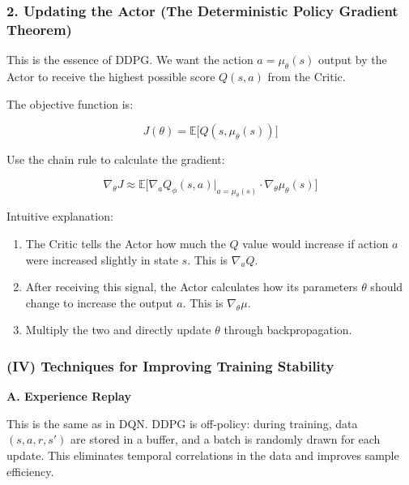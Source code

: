 \hypertarget{updating-the-actor-the-deterministic-policy-gradient-theorem}{%
\subsubsection{2. Updating the Actor (The Deterministic Policy Gradient Theorem)}\label{updating-the-actor-the-deterministic-policy-gradient-theorem}}

This is the essence of DDPG. We want the action \(a=\mu_\theta(s)\) output by the Actor to receive the highest possible score \(Q(s,a)\) from the Critic.

The objective function is:

\[
J(\theta)
=
\mathbb{E}\bigl[
Q(s,\mu_\theta(s))
\bigr]
\]

Use the chain rule to calculate the gradient:

\[
\nabla_\theta J
\approx
\mathbb{E}
\bigl[
\nabla_a Q_\phi(s,a)
\big|_{a=\mu_\theta(s)}
\cdot
\nabla_\theta \mu_\theta(s)
\bigr]
\]

Intuitive explanation:

\begin{enumerate}
\def\labelenumi{\arabic{enumi}.}
\tightlist
\item
  The Critic tells the Actor how much the \(Q\) value would increase if action \(a\) were increased slightly in state \(s\). This is \(\nabla_a Q\).
\item
  After receiving this signal, the Actor calculates how its parameters \(\theta\) should change to increase the output \(a\). This is \(\nabla_\theta\mu\).
\item
  Multiply the two and directly update \(\theta\) through backpropagation.
\end{enumerate}

\hypertarget{iv-techniques-for-improving-training-stability}{%
\subsubsection{(IV) Techniques for Improving Training Stability}\label{iv-techniques-for-improving-training-stability}}

\textbf{A. Experience Replay}

This is the same as in DQN. DDPG is off-policy: during training, data \((s,a,r,s')\) are stored in a buffer, and a batch is randomly drawn for each update. This eliminates temporal correlations in the data and improves sample efficiency.

